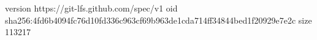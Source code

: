 version https://git-lfs.github.com/spec/v1
oid sha256:4fd6b4094fc76d10fd336c963cf69b963de1cda714ff34844bed1f20929e7e2c
size 113217
